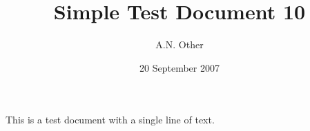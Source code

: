 \documentclass{article}
\date{20 September 2007}
\author{A.N. Other}
\title{Simple Test Document 10}
\begin{document}
\maketitleXXX

This is a test document with a single line of text.
\end{document}
